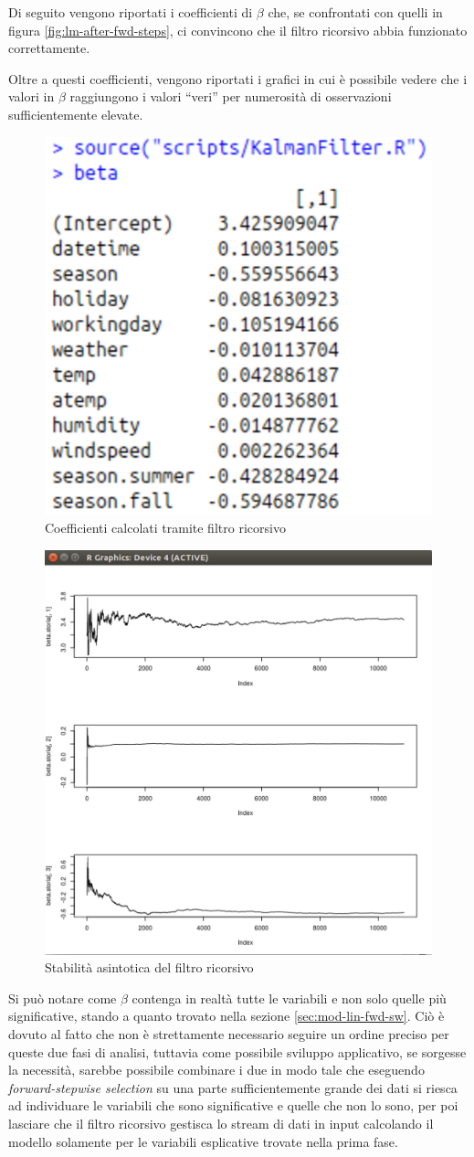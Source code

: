 Di seguito vengono riportati i coefficienti di $ \beta{} $ che, se confrontati
con quelli in figura \ref{fig:lm-after-fwd-steps}, ci convincono che il filtro
ricorsivo abbia funzionato correttamente.

Oltre a questi coefficienti, vengono riportati i grafici in cui è possibile
vedere che i valori in $ \beta{} $ raggiungono i valori ``veri'' per numerosità
di osservazioni sufficientemente elevate.

\begin{figure}[H]
  \centering
  \includegraphics[width=.55\columnwidth]{images/kalman-beta.eps}
  \caption{Coefficienti calcolati tramite filtro ricorsivo}
    \label{fig:kalman-beta}
\end{figure}

\begin{figure}[H]
  \centering
  \includegraphics[width=.55\columnwidth]{images/kalman-asymptotic.eps}
  \caption{Stabilità asintotica del filtro ricorsivo}
    \label{fig:kalman-asymptotic}
\end{figure}

Si può notare come $ \beta{} $ contenga in realtà tutte le variabili e non solo
quelle più significative, stando a quanto trovato nella sezione
\ref{sec:mod-lin-fwd-sw}. Ciò è dovuto al fatto che non è strettamente
necessario seguire un ordine preciso per queste due fasi di analisi, tuttavia
come possibile sviluppo applicativo, se sorgesse la necessità, sarebbe
possibile combinare i due in modo tale che eseguendo \emph{forward-stepwise
selection} su una parte sufficientemente grande dei dati si riesca ad
individuare le variabili che sono significative e quelle che non lo sono, per
poi lasciare che il filtro ricorsivo gestisca lo stream di dati in input
calcolando il modello solamente per le variabili esplicative trovate nella
prima fase.
